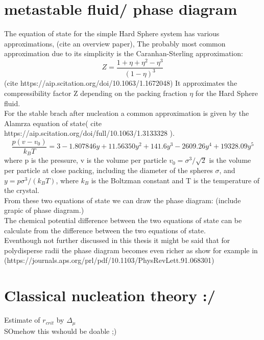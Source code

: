   
\section{metastable fluid/ phase diagram}
\label{sec:HS_phase_diagram}
The equation of state for the simple Hard Sphere system has various approximations, (cite an overview paper), The probably most common approximation due to its simplicity is the Caranhan-Sterling approximation:
\begin{equation}
Z=\frac{1+\eta+\eta^2-\eta^3}{(1-\eta)^3}
\end{equation}
(cite https://aip.scitation.org/doi/10.1063/1.1672048)
It approximates the compressibility factor Z depending on the packing fraction $\eta$ for the Hard Sphere fluid.\\

For the stable brach after nucleation a common approximation is given by the Alamrza equation of state( cite https://aip.scitation.org/doi/full/10.1063/1.3133328 ).
\begin{equation}
\frac{p(v-v_0)}{k_B T} = 3 - 1.807846 y + 11.56350 y^2 + 141.6 y^3 - 2609.26 y^4 + 19328.09 y^5
\end{equation}
where p is the pressure, v is the volume per particle $v_0=\sigma^3/\sqrt{2}$ is the volume per particle at close packing, including the diameter of the spheres $\sigma$, and $y=p \sigma^3 / (k_B T)$, where $k_B$ is the Boltzman constant and T is the temperature of the crystal.\\

From these two equations of state we can draw the phase diagram:
(include grapic of phase diagram.)\\

The chemical potential difference between the two equations of state can be calculate from the difference between the two equations of state.\\

Eventhough not further discussed in this thesis it might be said that for polydisperse radii the phase diagram becomes even richer as show for example in 
(https://journals.aps.org/prl/pdf/10.1103/PhysRevLett.91.068301)

\section{Classical nucleation theory :/}
\label{sec:CNT}
Estimate of $r_{crit}$ by $\Delta_{\mu}$\\
SOmehow this wshould be doable ;)

